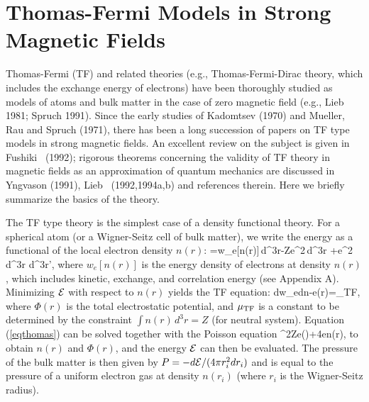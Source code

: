 \section{Thomas-Fermi Models in Strong Magnetic Fields}

Thomas-Fermi (TF) and related theories (e.g., Thomas-Fermi-Dirac theory,
which includes the exchange energy of electrons)
have been thoroughly studied as models of atoms and bulk matter 
in the case of zero magnetic field (e.g., Lieb 1981; 
Spruch 1991). Since the early studies of Kadomtsev (1970) and Mueller, Rau and
Spruch (1971), there has been a long succession of papers on TF type
models in strong magnetic fields.
An excellent review on the subject is given in Fushiki \etal~(1992); 
rigorous theorems concerning the validity of TF theory in magnetic fields 
as an approximation of quantum mechanics are discussed in 
Yngvason (1991), Lieb \etal~(1992,1994a,b)
and references therein. Here we briefly summarize the basics of the theory.

The TF type theory is the simplest case of a density functional theory.
For a spherical atom (or a Wigner-Seitz cell of bulk matter), we write
the energy as a functional of the local electron density $n(r)$:
\be
\cE[n(r)]=\int\!\!w_e[n(r)]\,d^3r-Ze^2\int{}\,d^3r
+{e^2}\int{}\,d^3r d^3r',
\ee
where $w_e[n(r)]$ is the energy density of electrons at density $n(r)$, which
includes kinetic, exchange, and correlation energy (see Appendix A).  
Minimizing ${\cal E}$ with respect to $n(r)$ yields
the TF equation:
\be
{dw_e\over dn}-e\Phi(r)=\mu_{\rm TF},
\label{eqthomas}\ee
where $\Phi(r)$ is the total electrostatic potential, and
$\mu_{\rm TF}$ is a constant to be determined by the constraint
$\int\!n(r)\,d^3r=Z$ (for neutral system). Equation (\ref{eqthomas})
can be solved together with the Poisson equation
\be
\nabla^2\pi Ze\delta(\br)+4\pi en(r),
\label{eqpoisson}\ee
to obtain $n(r)$ and $\Phi(r)$, and the energy ${\cal E}$ can then be evaluated.
The pressure of the bulk matter is then given by
$P=-d{\cal E}/(4\pi r_i^2 dr_i)$ and is equal to the pressure of
a uniform electron gas at density $n(r_i)$ (where $r_i$ is the Wigner-Seitz 
radius). 

